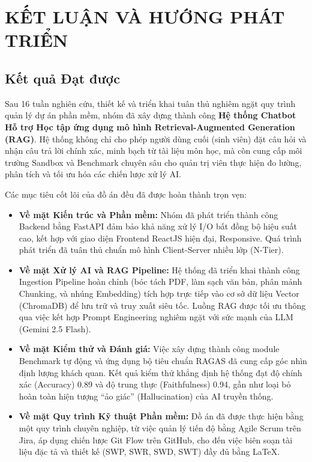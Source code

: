 \chapter{KẾT LUẬN VÀ HƯỚNG PHÁT TRIỂN}

\section{Kết quả Đạt được}

Sau 16 tuần nghiên cứu, thiết kế và triển khai tuân thủ nghiêm ngặt quy trình quản lý dự án phần mềm, nhóm đã xây dựng thành công \textbf{Hệ thống Chatbot Hỗ trợ Học tập ứng dụng mô hình Retrieval-Augmented Generation (RAG)}. Hệ thống không chỉ cho phép người dùng cuối (sinh viên) đặt câu hỏi và nhận câu trả lời chính xác, minh bạch từ tài liệu môn học, mà còn cung cấp môi trường Sandbox và Benchmark chuyên sâu cho quản trị viên thực hiện đo lường, phân tích và tối ưu hóa các chiến lược xử lý AI.

Các mục tiêu cốt lõi của đồ án đều đã được hoàn thành trọn vẹn:

\begin{itemize}[itemsep=4pt]
  \item \textbf{Về mặt Kiến trúc và Phần mềm:} Nhóm đã phát triển thành công Backend bằng FastAPI đảm bảo khả năng xử lý I/O bất đồng bộ hiệu suất cao, kết hợp với giao diện Frontend ReactJS hiện đại, Responsive. Quá trình phát triển đã tuân thủ chuẩn mô hình Client-Server nhiều lớp (N-Tier).
  
  \item \textbf{Về mặt Xử lý AI và RAG Pipeline:} Hệ thống đã triển khai thành công Ingestion Pipeline hoàn chỉnh (bóc tách PDF, làm sạch văn bản, phân mảnh Chunking, và nhúng Embedding) tích hợp trực tiếp vào cơ sở dữ liệu Vector (ChromaDB) để lưu trữ và truy xuất siêu tốc. Luồng RAG được tối ưu thông qua việc kết hợp Prompt Engineering nghiêm ngặt với sức mạnh của LLM (Gemini 2.5 Flash).
  
  \item \textbf{Về mặt Kiểm thử và Đánh giá:} Việc xây dựng thành công module Benchmark tự động và ứng dụng bộ tiêu chuẩn RAGAS đã cung cấp góc nhìn định lượng khách quan. Kết quả kiểm thử khẳng định hệ thống đạt độ chính xác (Accuracy) 0.89 và độ trung thực (Faithfulness) 0.94, gần như loại bỏ hoàn toàn hiện tượng ``ảo giác'' (Hallucination) của AI truyền thống.
  
  \item \textbf{Về mặt Quy trình Kỹ thuật Phần mềm:} Đồ án đã được thực hiện bằng một quy trình chuyên nghiệp, từ việc quản lý tiến độ bằng Agile Scrum trên Jira, áp dụng chiến lược Git Flow trên GitHub, cho đến việc biên soạn tài liệu đặc tả và thiết kế (SWP, SWR, SWD, SWT) đầy đủ bằng LaTeX.
\end{itemize}

